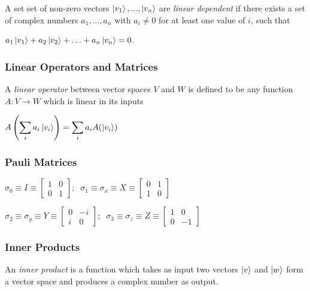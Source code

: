\documentclass{article}
\begin{document}
A set set of non-zero vectors $\ket{v_{1}},...,\ket{v_{n}}$ are
\emph{linear dependent} if there exists a set of complex numbers
$a_{1},...,a_{n}$ with $a_{i} \neq 0$ for at least one value of $i$, such that
\begin{center}
  $a_{1}\ket{v_{1}} + a_{2}\ket{v_{2}} + \hdots + a_{n}\ket{v_{n}} = 0$.
\end{center}

\subsubsection{Linear Operators and Matrices}
A \emph{linear operator} between vector spaces $V$ and $W$ is defined to be any
function $A : V \rightarrow W$ which is linear in its inputs
  \begin{center}
    $A\left(\displaystyle\sum_{i}a_{i}\ket{v_{i}}\right) =
    \displaystyle\sum_{i}a_{i}A(\ket{v_{i}})$
  \end{center}

\subsubsection{Pauli Matrices}
  \begin{center}
    $
    \sigma_{0} \equiv I \equiv
      \begin{bmatrix} 1 & 0 \\
      0 & 1 \end{bmatrix};\mspace{10mu}
    \sigma_{1} \equiv \sigma_{x} \equiv X \equiv
      \begin{bmatrix} 0 & 1 \\
      1 & 0 \end{bmatrix}
    $
  \end{center}

  \begin{center}
    $
    \sigma_{2} \equiv \sigma_{y} \equiv Y \equiv
      \begin{bmatrix} 0 & -i \\
      i & 0 \end{bmatrix};\mspace{10mu}
    \sigma_{3} \equiv \sigma_{z} \equiv Z \equiv
      \begin{bmatrix} 1 & 0 \\
      0 & -1 \end{bmatrix}
    $
  \end{center}

\subsubsection{Inner Products}
An \emph{inner product} is a function which takes as input two vectors
$\ket{v}$ and $\ket{w}$ form a vector space and produces a complex number
as output.
\end{document}
